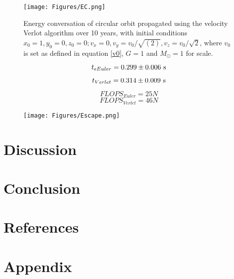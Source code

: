 \documentclass[%
reprint,nofootinbib,
amsmath,amssymb,
aps,
]{revtex4-1}
\begin{document}
\twocolumngrid

\begin{figure}[H]
	\texttt{[image: Figures/EC.png]}
	\caption{\label{energy} Energy conversation of circular orbit propagated using the velocity Verlot algorithm over 10 years, with initial conditions  $x_0 = 1, y_0 = 0, z_0 = 0; v_x = 0, v_y = v_0/\sqrt{(2)}, v_z = v_0/\sqrt{2}$, where $v_0$ is set as defined in equation \ref{v0}, $G = 1$ and $M_\odot = 1$ for scale.}
\end{figure}

\begin{equation*}
	t_{eEuler} = 0.299 \pm 0.006 \textnormal{ s}
\end{equation*}

\begin{equation*}
t_{Verlet} =0.314 \pm 0.009 \textnormal{ s}
\end{equation*}

\begin{equation*}
	FLOPS_{Euler} = 25N
\end{equation*}
\begin{equation*}
FLOPS_{Verlet} = 46N
\end{equation*}

\begin{figure}[H]
	\texttt{[image: Figures/Escape.png]}
	\caption{\label{escape} }
\end{figure}


\section{Discussion} \noindent
\section{Conclusion} \noindent  




\onecolumngrid 
\newpage 
\section{References}
{}


\section{Appendix}
\end{document}
